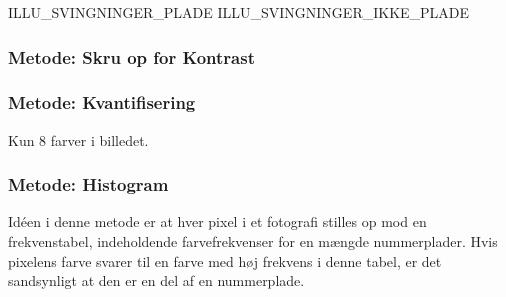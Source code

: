 ILLU\_SVINGNINGER\_PLADE ILLU\_SVINGNINGER\_IKKE\_PLADE



\subsubsection*{Metode: Skru op for Kontrast}



\subsubsection*{Metode: Kvantifisering}
Kun 8 farver i billedet.

\subsubsection*{Metode: Histogram}
\label{sec_histo}

Idéen i denne metode er at hver pixel i et fotografi stilles op mod en frekvenstabel, indeholdende farvefrekvenser for en mængde nummerplader. Hvis pixelens farve svarer til en farve med høj frekvens i denne tabel, er det sandsynligt at den er en del af en nummerplade.




